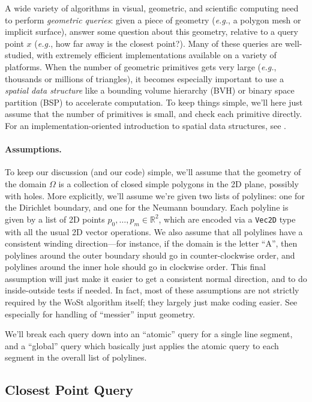 \documentclass{article}
\newcommand{\code}[1]{\texttt{#1}}
\newcommand{\eg}{\emph{e.g.}} %
\renewcommand{\vec}[1]{#1}
\begin{document}
A wide variety of algorithms in visual, geometric, and scientific computing need to perform \emph{geometric queries}: given a piece of geometry (\eg{}, a polygon mesh or implicit surface), answer some question about this geometry, relative to a query point \(x\) (\eg{}, how far away is the closest point?).  Many of these queries are well-studied, with extremely efficient implementations available on a variety of platforms.  When the number of geometric primitives gets very large (\eg{}, thousands or millions of triangles), it becomes especially important to use a \emph{spatial data structure} like a bounding volume hierarchy (BVH) or binary space partition (BSP) to accelerate computation.  To keep things simple, we'll here just assume that the number of primitives is small, and check each primitive directly.  For an implementation-oriented introduction to spatial data structures, see \citet[Section 4.2]{pharr2016physically}.

\paragraph{Assumptions.} To keep our discussion (and our code) simple, we'll assume that the geometry of the domain \(\Omega\) is a collection of closed simple polygons in the 2D plane, possibly with holes.  More explicitly, we'll assume we're given two lists of polylines: one for the Dirichlet boundary, and one for the Neumann boundary.  Each polyline is given by a list of 2D points \(\vec{p}_0, \ldots, \vec{p}_m \in \mathbb{R}^2\), which are encoded via a \code{Vec2D} type with all the usual 2D vector operations.  We also assume that all polylines have a consistent winding direction---for instance, if the domain is the letter ``A'', then polylines around the outer boundary should go in counter-clockwise order, and polylines around the inner hole should go in clockwise order.  This final assumption will just make it easier to get a consistent normal direction, and to do inside-outside tests if needed.  In fact, most of these assumptions are not strictly required by the WoSt algorithm itself; they largely just make coding easier.  See especially \citet[Appendix B]{Sawhney:2023:WoSt} for handling of ``messier'' input geometry.

We'll break each query down into an ``atomic'' query for a single line segment, and a ``global'' query which basically just applies the atomic query to each segment in the overall list of polylines.

\subsection{Closest Point Query}
\label{sec:ClosestPointQuery}
\end{document}
